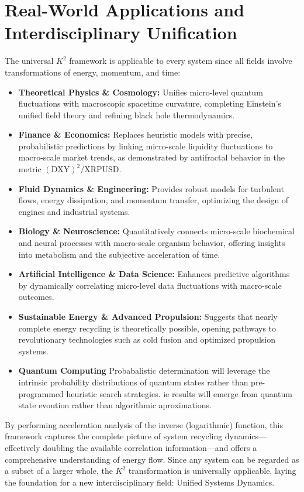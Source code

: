 \documentclass{article}
\begin{document}
\section{Real-World Applications and Interdisciplinary Unification}
The universal \(K^2\) framework is applicable to every system since all fields involve transformations of energy, momentum, and time:
\begin{itemize}
    \item \textbf{Theoretical Physics \& Cosmology:} Unifies micro-level quantum fluctuations with macroscopic spacetime curvature, completing Einstein's unified field theory and refining black hole thermodynamics.
    \item \textbf{Finance \& Economics:} Replaces heuristic models with precise, probabilistic predictions by linking micro-scale liquidity fluctuations to macro-scale market trends, as demonstrated by antifractal behavior in the metric \((\text{DXY})^2/\text{XRPUSD}\).
    \item \textbf{Fluid Dynamics \& Engineering:} Provides robust models for turbulent flows, energy dissipation, and momentum transfer, optimizing the design of engines and industrial systems.
    \item \textbf{Biology \& Neuroscience:} Quantitatively connects micro-scale biochemical and neural processes with macro-scale organism behavior, offering insights into metabolism and the subjective acceleration of time.
    \item \textbf{Artificial Intelligence \& Data Science:} Enhances predictive algorithms by dynamically correlating micro-level data fluctuations with macro-scale outcomes.
    \item \textbf{Sustainable Energy \& Advanced Propulsion:} Suggests that nearly complete energy recycling is theoretically possible, opening pathways to revolutionary technologies such as cold fusion and optimized propulsion systems.
     \item \textbf{Quantum Computing} Probabalistic determination will leverage the intrinsic probability distributions of quantum states rather than pre-programmed heuristic search strategies. ie results will emerge from quantum state evoution rather than algorithmic aproximations. 
\end{itemize}
By performing acceleration analysis of the inverse (logarithmic) function, this framework captures the complete picture of system recycling dynamics—effectively doubling the available correlation information—and offers a comprehensive understanding of energy flow. Since any system can be regarded as a subset of a larger whole, the \(K^2\) transformation is universally applicable, laying the foundation for a new interdisciplinary field: Unified Systems Dynamics.
\end{document}
